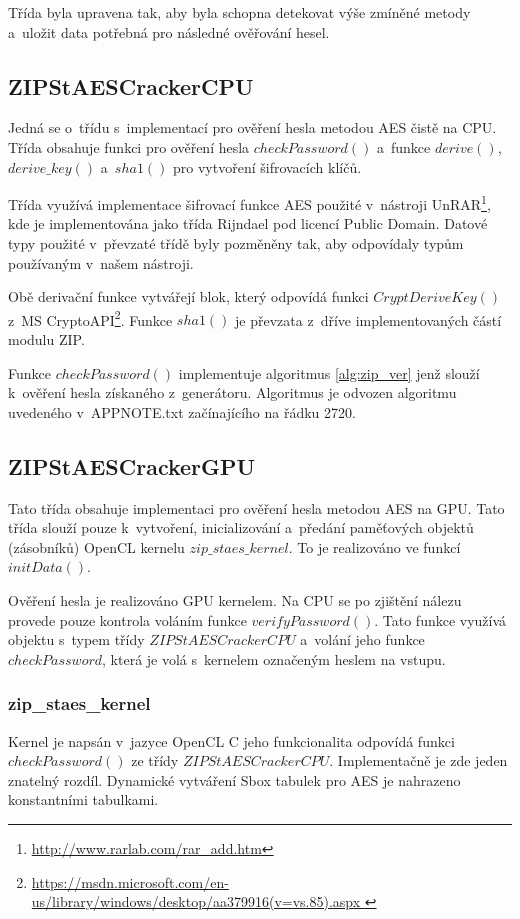  Třída byla upravena tak, aby byla schopna detekovat výše zmíněné metody a~uložit data potřebná pro
následné ověřování hesel.

\subsection{ZIPStAESCrackerCPU}
Jedná se o~třídu s~implementací pro ověření hesla metodou AES čistě na CPU. Třída obsahuje funkci
pro ověření hesla $checkPassword()$ a~funkce $derive()$, $derive\_key()$ a~$sha1()$ pro vytvoření
šifrovacích klíčů.

Třída využívá implementace šifrovací funkce AES použité v~nástroji
UnRAR\footnote{\url{http://www.rarlab.com/rar\_add.htm}}, kde je implementována jako třída Rijndael
pod licencí Public Domain. Datové typy použité v~převzaté třídě byly pozměněny tak, aby odpovídaly
typům používaným v~našem nástroji.

Obě derivační funkce vytvářejí blok, který odpovídá funkci $CryptDeriveKey()$ z~MS
CryptoAPI\footnote{\url{https://msdn.microsoft.com/en-us/library/windows/desktop/aa379916(v=vs.85).aspx
}}. Funkce $sha1()$ je převzata z~dříve implementovaných částí modulu ZIP.

 Funkce $checkPassword()$ implementuje algoritmus \ref{alg:zip_ver} jenž slouží k~ověření hesla
získaného z~generátoru. Algoritmus je odvozen algoritmu uvedeného v~APPNOTE.txt začínajícího na
řádku 2720.

\subsection{ZIPStAESCrackerGPU}
Tato třída obsahuje implementaci pro ověření hesla metodou AES na GPU. Tato třída slouží pouze
k~vytvoření, inicializování a~předání paměťových objektů (zásobníků) OpenCL kernelu
$zip\_staes\_kernel$. To je realizováno ve funkcí $initData()$. 

 Ověření hesla je realizováno GPU kernelem. Na CPU se po zjištění nálezu provede pouze
kontrola voláním funkce $verifyPassword()$. Tato funkce využívá objektu s~typem třídy
$ZIPStAESCrackerCPU$ a~volání jeho funkce $checkPassword$, která je volá s~kernelem označeným
heslem na vstupu.

\subsubsection{zip\_staes\_kernel}
Kernel je napsán v~jazyce OpenCL C jeho funkcionalita odpovídá funkci \linebreak $checkPassword()$ ze
třídy $ZIPStAESCrackerCPU$. Implementačně je zde jeden znatelný rozdíl. Dynamické vytváření Sbox
tabulek pro AES je nahrazeno konstantními tabulkami.
 
